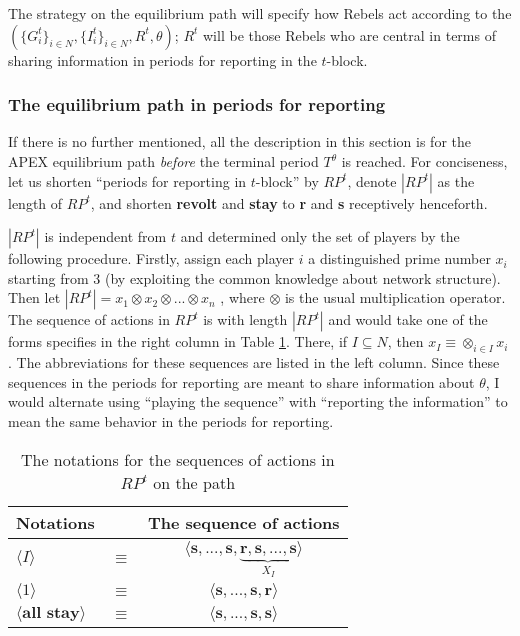 \documentclass[12pt,letter]{article}
\theoremstyle{definition}
\theoremstyle{remark}
\theoremstyle{claim}
\begin{document}
The strategy on the equilibrium path will specify how Rebels act according to the $(\{G^{t}_i\}_{i\in N}, \{I^{t}_i\}_{i\in N}, R^t,\theta)$; $R^t$ will be those Rebels who are central in terms of sharing information in periods for reporting in the $t$-block. 

\subsubsection{The equilibrium path in periods for reporting}
\label{sec:eq_rp}
If there is no further mentioned, all the description in this section is for the APEX equilibrium path \textit{before} the terminal period $T^{\theta}$ is reached. For conciseness, let us shorten ``periods for reporting in $t$-block'' by $RP^{t}$, denote $|RP^t|$ as the length of $RP^{t}$, and shorten \textbf{revolt} and \textbf{stay} to \textbf{r} and \textbf{s} receptively henceforth. 

$|RP^{t}|$ is independent from $t$ and determined only the set of players by the following procedure. Firstly, assign each player $i$ a distinguished prime number $x_i$ starting from $3$ (by exploiting the common knowledge about network structure). Then let $|RP^{t}|=x_1\otimes x_2\otimes...\otimes x_n$ , where $\otimes$ is the usual multiplication operator. The sequence of actions in $RP^{t}$ is with length $|RP^t|$ and would take one of the forms specifies in the right column in Table \ref{Table_msg_form}. There, if $I\subseteq N$, then $x_{I}\equiv \otimes_{i\in I}x_i$. The abbreviations for these sequences are listed in the left column. Since these sequences in the periods for reporting are meant to share information about $\theta$, I would alternate using ``playing the sequence'' with ``reporting the information'' to mean the same behavior in the periods for reporting.


\begin{table}[!htbp]
\caption{The notations for the sequences of actions in $RP^t$ on the path}
\label{Table_msg_form}
\begin{center}
\begin{tabular}{l c c}
Notations && The sequence of actions\\
\hline
\hline
$\langle  I \rangle$ 				& $\equiv$ 			& $\langle \textbf{s},...,\textbf{s},\underbrace{\textbf{r},\textbf{s},...,\textbf{s}}_{X_{I}} \rangle$  \\
$\langle 1 \rangle$	 					& $\equiv$ 			& $\langle \textbf{s},...,\textbf{s},{\textbf{r}}\rangle$  \\
$\langle \textbf{all stay} \rangle$	 					& $\equiv$ 			& $\langle \textbf{s},...,\textbf{s},{\textbf{s}}\rangle$  \\
\hline
\end{tabular}
\end{center}
\end{table}
\end{document}
